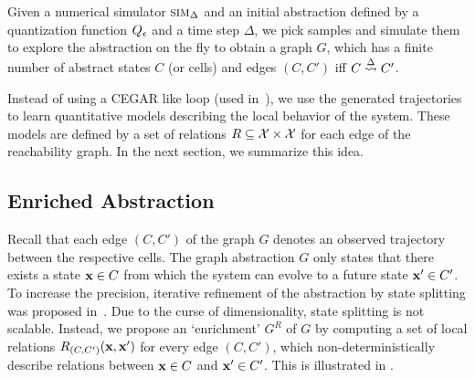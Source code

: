 Given a numerical simulator $\mbox{\sc sim}_\Delta$ and an initial abstraction
defined by a quantization function $Q_\epsilon$ and a time step
$\Delta$, we pick samples and simulate them to explore the abstraction
on the fly to obtain a graph $G$, which has a finite number of
abstract states $C$ (or cells) and edges $(C,C')$ iff $C
\overset{\Delta}{\rightsquigarrow} C'$.



Instead of using a CEGAR like loop (used in~\cite{zutshi2014multiple}),
we use the generated trajectories to learn quantitative models
describing the local behavior of the system. These models are defined
by a set of relations $R \subseteq \mathcal{X} \times \mathcal{X}$
for each edge of the reachability graph. In the next section, we
summarize this idea.


\subsection{Enriched Abstraction}



Recall that each edge $(C,C')$ of the graph $G$ denotes an observed
trajectory between the respective cells. The graph abstraction $G$
only states that there exists a state $\mathbf{x} \in C$ from which the system
can evolve to a future state $\mathbf{x}' \in C'$. To increase the precision,
iterative refinement of the abstraction by state splitting was
proposed in~\cite{zutshi2014multiple}. Due to the curse of
dimensionality, state splitting is not scalable. Instead, we propose
an `enrichment' $G^R$ of $G$ by computing a set of local relations
$R_{(C,C')}(\mathbf{x},\mathbf{x}')$ for every edge $(C,C')$, which
non-deterministically describe relations between $\mathbf{x} \in C$ and $\mathbf{x}'
\in C'$. This is illustrated in .

